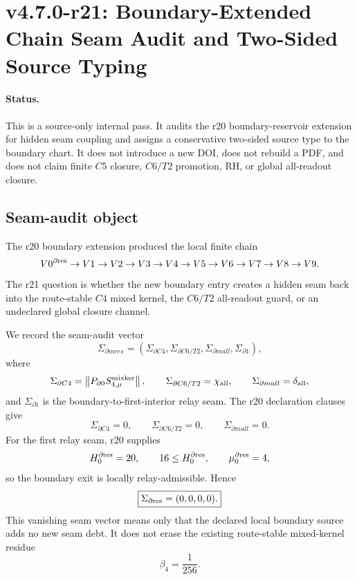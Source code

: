 \section{v4.7.0-r21: Boundary-Extended Chain Seam Audit and Two-Sided Source Typing}
\label{sec:v470-r21-boundary-chain-seam-typing}

\paragraph{Status.}
This is a source-only internal pass.  It audits the r20 boundary-reservoir
extension for hidden seam coupling and assigns a conservative two-sided source
type to the boundary chart.  It does not introduce a new DOI, does not rebuild a
PDF, and does not claim finite \(C5\) closure, \(C6/T2\) promotion, RH, or
global all-readout closure.

\subsection{Seam-audit object}
\label{subsec:v470-r21-seam-audit-object}

The r20 boundary extension produced the local finite chain
\[
V0^{\partial{\rm res}}
\to
V1\to V2\to V3\to V4\to V5\to V6\to V7\to V8\to V9.
\]
The r21 question is whether the new boundary entry creates a hidden seam back
into the route-stable \(C4\) mixed kernel, the \(C6/T2\) all-readout guard, or
an undeclared global closure channel.

We record the seam-audit vector
\[
\Sigma_{\partial{
m res}}
=
\left(
\Sigma_{\partial C4},
\Sigma_{\partial C6/T2},
\Sigma_{\partial{
m all}},
\Sigma_{\partial 1}
\right),
\]
where
\[
\Sigma_{\partial C4}
=
\left\|P_{\partial0}S_{4,\mu}^{\rm mixker}\right\|,
\qquad
\Sigma_{\partial C6/T2}=\chi_{\rm all},
\qquad
\Sigma_{\partial{
m all}}=\delta_{\rm all},
\]
and \(\Sigma_{\partial 1}\) is the boundary-to-first-interior relay seam.
The r20 declaration clauses give
\[
\Sigma_{\partial C4}=0,
\qquad
\Sigma_{\partial C6/T2}=0,
\qquad
\Sigma_{\partial{
m all}}=0.
\]
For the first relay seam, r20 supplies
\[
H_0^{\partial{\rm res}}=20,
\qquad
16\leq H_0^{\partial{\rm res}},
\qquad
\mu_0^{\partial{\rm res}}=4,
\]
so the boundary exit is locally relay-admissible.  Hence
\[
\boxed{
\Sigma_{\partial{\rm res}}=(0,0,0,0).
}
\]
This vanishing seam vector means only that the declared local boundary source
adds no new seam debt.  It does not erase the existing route-stable mixed-kernel
residue
\[
\boxed{\beta_4=\frac1{256}.}
\]


